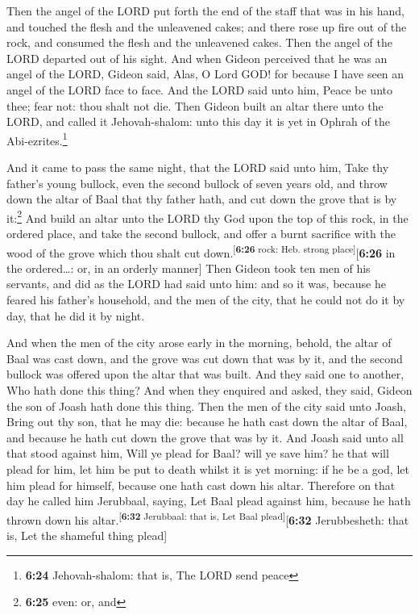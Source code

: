  Then the angel of the LORD put forth the end of the
staff that was in his hand, and touched the flesh and the unleavened
cakes; and there rose up fire out of the rock, and consumed the flesh
and the unleavened cakes. Then the angel of the LORD departed out of his
sight.  And when Gideon perceived that he was an angel of
the LORD, Gideon said, Alas, O Lord GOD! for because I have seen an
angel of the LORD face to face.  And the LORD said unto
him, Peace be unto thee; fear not: thou shalt not die. 
Then Gideon built an altar there unto the LORD, and called it
Jehovah-shalom: unto this day it is yet in Ophrah of the
Abi-ezrites.\footnote{\textbf{6:24} Jehovah-shalom: that is, The LORD
  send peace}

 And it came to pass the same night, that the LORD said
unto him, Take thy father's young bullock, even the second bullock of
seven years old, and throw down the altar of Baal that thy father hath,
and cut down the grove that is by it:\footnote{\textbf{6:25} even: or,
  and}  And build an altar unto the LORD thy God upon the
top of this rock, in the ordered place, and take the second bullock, and
offer a burnt sacrifice with the wood of the grove which thou shalt cut
down.\textsuperscript{{[}\textbf{6:26} rock: Heb. strong
place{]}}{[}\textbf{6:26} in the ordered\ldots: or, in an orderly
manner{]}  Then Gideon took ten men of his servants, and
did as the LORD had said unto him: and so it was, because he feared his
father's household, and the men of the city, that he could not do it by
day, that he did it by night.

 And when the men of the city arose early in the morning,
behold, the altar of Baal was cast down, and the grove was cut down that
was by it, and the second bullock was offered upon the altar that was
built.  And they said one to another, Who hath done this
thing? And when they enquired and asked, they said, Gideon the son of
Joash hath done this thing.  Then the men of the city
said unto Joash, Bring out thy son, that he may die: because he hath
cast down the altar of Baal, and because he hath cut down the grove that
was by it.  And Joash said unto all that stood against
him, Will ye plead for Baal? will ye save him? he that will plead for
him, let him be put to death whilst it is yet morning: if he be a god,
let him plead for himself, because one hath cast down his altar.
 Therefore on that day he called him Jerubbaal, saying,
Let Baal plead against him, because he hath thrown down his
altar.\textsuperscript{{[}\textbf{6:32} Jerubbaal: that is, Let Baal
plead{]}}{[}\textbf{6:32} Jerubbesheth: that is, Let the shameful thing
plead{]}

